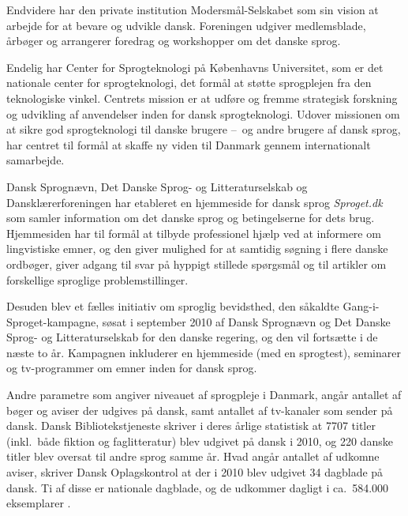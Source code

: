 \begin{multicols}{2}

Endvidere har den private institution Moders\-m\aa l-Selskabet som sin vision at arbejde for at bevare og udvikle dansk. Foreningen udgiver medlemsblade, \aa rb\o ger og arrangerer foredrag og workshopper om det danske sprog.


Endelig har Center for Sprogteknologi \mbox{p\aa} K\o benhavns Universitet, som er det nationale center for sprogteknologi, det form\aa l at st\o tte sprogplejen fra den teknologiske vinkel. Centrets mission er at udf\o re og fremme strategisk forskning og udvikling af anvendelser inden for dansk sprogteknologi. Udover missionen om at sikre god sprogteknologi til danske brugere --~og andre brugere af dansk sprog, har centret til form\aa l at skaffe ny viden til Danmark gennem internationalt samarbejde.

Dansk Sprogn\ae vn, Det Danske Sprog- og Litteraturselskab og Danskl\ae rerforeningen har etableret en hjemmeside for dansk sprog {\it Sproget.dk} som samler information om det danske sprog og betingelserne for dets brug. Hjemmesiden har til form\aa l at tilbyde professionel hj\ae lp ved at informere om lingvistiske emner, og den giver mulighed for at samtidig s\o gning i flere danske ordb\o ger, giver adgang til svar \mbox{p\aa} hyppigt stillede sp\o rgsm\aa l og til artikler om forskellige sproglige problemstillinger.

\sloppy
Desuden blev et f\ae lles initiativ om sproglig bevidsthed, den s\aa kaldte Gang-i-Sproget-kampagne, s\o sat i september 2010 af Dansk Sprogn\ae vn og Det Danske Sprog- og Litteraturselskab for den danske regering, og den vil forts\ae tte i de n\ae ste to \aa r. Kampagnen inkluderer en hjemmeside (med en sprogtest), seminarer og tv-programmer om emner inden for dansk sprog.

Andre parametre som angiver niveauet af sprogpleje i Danmark, ang\aa r antallet af b\o ger og aviser der udgives \mbox{p\aa} dansk, samt antallet af tv-kanaler som sender \mbox{p\aa} dansk. Dansk Bibliotekstjeneste skriver i deres \aa rlige statistisk at 7707 titler (inkl.\ b\aa de fiktion og faglitteratur) blev udgivet \mbox{p\aa} dansk i 2010, og 220 danske titler blev oversat til andre sprog samme \aa r. Hvad ang\aa r antallet af udkomne aviser, skriver Dansk Oplagskontrol at der i 2010 blev udgivet 34 dagblade \mbox{p\aa} dansk. Ti af disse er nationale dagblade, og de udkommer dagligt i ca.\ 584.000 eksemplarer \cite{ddo}.


\end{multicols}

